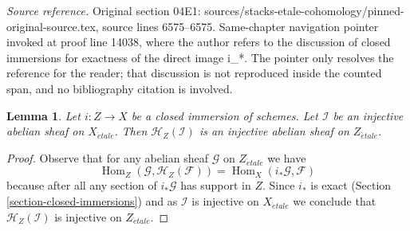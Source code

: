 \documentclass[10pt,a4paper]{amsart}
\theoremstyle{plain}
\newtheorem{lemma}[subsection]{Lemma}
\theoremstyle{definition}
\theoremstyle{remark}
\numberwithin{equation}{subsection}
\def\Hom{\mathop{\mathrm{Hom}}\nolimits}
\def\etale{{\acute{e}tale}}
\begin{document}
\noindent\textit{Source reference.} Original section 04E1: sources/stacks-etale-cohomology/pinned-original-source.tex, source lines 6575--6575. Same-chapter navigation pointer invoked at proof line 14038, where the author refers to the discussion of closed immersions for exactness of the direct image i\_*. The pointer only resolves the reference for the reader; that discussion is not reproduced inside the counted span, and no bibliography citation is involved.\par\medskip
\begin{lemma}
\label{lemma-sections-with-support-acyclic}
Let $i : Z \to X$ be a closed immersion of schemes.
Let $\mathcal{I}$ be an injective abelian sheaf on $X_\etale$.
Then $\mathcal{H}_Z(\mathcal{I})$ is an injective abelian sheaf
on $Z_\etale$.
\end{lemma}

\begin{proof}
Observe that for any abelian sheaf $\mathcal{G}$ on $Z_\etale$
we have
$$
\Hom_Z(\mathcal{G}, \mathcal{H}_Z(\mathcal{F})) =
\Hom_X(i_*\mathcal{G}, \mathcal{F})
$$
because after all any section of $i_*\mathcal{G}$ has support in $Z$.
Since $i_*$ is exact (Section \ref{section-closed-immersions}) and as
$\mathcal{I}$ is injective on $X_\etale$ we conclude that
$\mathcal{H}_Z(\mathcal{I})$ is injective on $Z_\etale$.
\end{proof}
\end{document}

